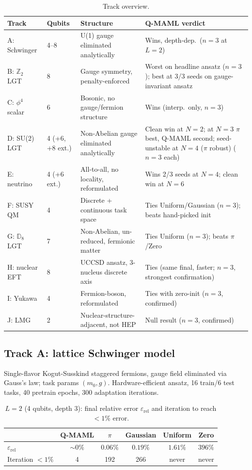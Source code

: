 \documentclass[11pt]{article}
\begin{document}
\begin{table}[ht]
\centering\small
\caption{Track overview.}
\label{tab:tracks-overview}
\begin{tabular}{p{}p{}p{}p{}}
\toprule
Track & Qubits & Structure & Q-MAML verdict \\
\midrule
A: Schwinger & 4--8 & U(1) gauge eliminated analytically & Wins, depth-dep.\ ($n{=}3$ at $L{=}2$) \\
B: $\mathbb{Z}_2$ LGT & 8 & Gauge symmetry, penalty-enforced & Worst on headline ansatz ($n{=}3$); best at 3/3 seeds on gauge-invariant ansatz \\
C: $\phi^4$ scalar & 6 & Bosonic, no gauge/fermion structure & Wins (interp.\ only, $n{=}3$) \\
D: SU(2) LGT & 4 (+6, +8 ext.) & Non-Abelian gauge eliminated analytically & Clean win at $N{=}2$; at $N{=}3$ $\pi$ best, Q-MAML second; seed-unstable at $N{=}4$ ($\pi$ robust) ($n{=}3$ each) \\
E: neutrino & 4 (+6 ext.) & All-to-all, no locality, reformulated & Wins 2/3 seeds at $N{=}4$; clean win at $N{=}6$ \\
F: SUSY QM & 4 & Discrete + continuous task space & Ties Uniform/Gaussian ($n{=}3$); beats hand-picked init \\
G: $\mathbb{D}_8$ LGT & 7 & Non-Abelian, un-reduced, fermionic matter & Ties Uniform ($n{=}3$); beats $\pi$/Zero \\
H: nuclear EFT & 8 & UCCSD ansatz, 3-nucleus discrete axis & Ties (same final, faster; $n{=}3$, strongest confirmation) \\
I: Yukawa & 4 & Fermion-boson, reformulated & Ties with zero-init ($n{=}3$, confirmed) \\
J: LMG & 2 & Nuclear-structure-adjacent, not HEP & Null result ($n{=}3$, confirmed) \\
\bottomrule
\end{tabular}
\end{table}

\FloatBarrier
\subsection{Track A: lattice Schwinger model}
\label{sec:track-a}
Single-flavor Kogut-Susskind staggered fermions, gauge field eliminated via Gauss's law; task params
$(m_0, g)$. Hardware-efficient ansatz, 16 train/6 test tasks, 40 pretrain epochs, 300 adaptation iterations.

\begin{table}[ht]
\centering
\caption{$L{=}2$ (4 qubits, depth 3): final relative error $\varepsilon_{\mathrm{rel}}$ and iteration to
reach $<1\%$ error.}
\label{tab:schwinger-l2}
\begin{tabular}{lccccc}
\toprule
& Q-MAML & $\pi$ & Gaussian & Uniform & Zero \\
\midrule
$\varepsilon_{\mathrm{rel}}$ & $\sim0\%$ & $0.06\%$ & $0.19\%$ & $1.61\%$ & $396\%$ \\
Iteration $<1\%$ & 4 & 192 & 266 & never & never \\
\bottomrule
\end{tabular}
\end{table}
\end{document}
